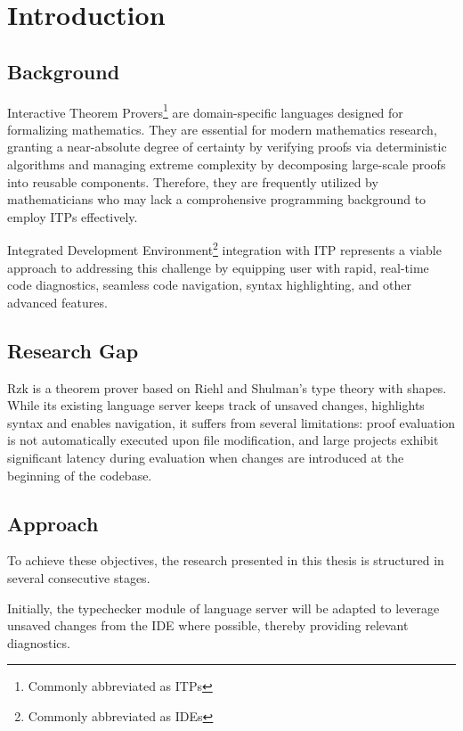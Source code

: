 \chapter{Introduction}
\label{chap:intro}

\section{Background}
\label{intro:bgr}

Interactive Theorem Provers\footnote{Commonly abbreviated as ITPs} are domain-specific languages
designed for formalizing mathematics.
They are essential for modern mathematics research,
granting a near-absolute degree of certainty by verifying proofs via deterministic algorithms and
managing extreme complexity by decomposing large-scale proofs into reusable components.
Therefore, they are frequently utilized by mathematicians
who may lack a comprohensive programming background to employ ITPs effectively.

Integrated Development Environment\footnote{Commonly abbreviated as IDEs} integration with ITP
represents a viable approach to addressing this challenge by
equipping user with rapid, real-time code diagnostics, seamless code navigation,
syntax highlighting, and other advanced features.

\section{Research Gap}
\label{intro:gap}

Rzk is a theorem prover based on Riehl and Shulman's type theory\cite{riehl2023typetheorysyntheticinftycategories} with shapes.
While its existing language server keeps track of unsaved changes,
highlights syntax and enables navigation, it suffers from several limitations:
proof evaluation is not automatically executed upon file modification,
and large projects exhibit significant latency during evaluation
when changes are introduced at the beginning of the codebase.

\section{Approach}
\label{intro:plan}

To achieve these objectives, the research presented in this thesis is structured in several consecutive stages.

Initially, the typechecker module of language server will be adapted
to leverage unsaved changes from the IDE where possible, thereby providing relevant diagnostics.

